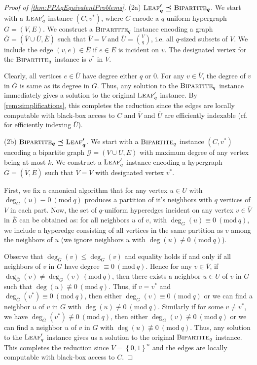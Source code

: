 \documentclass[10pt,a4paper]{article}
\theoremstyle{definition}
\theoremstyle{remark}
\newcommand{\contour}[2]{#2}
\newcommand{\inparen}[1]{\left ( #1 \right )}
\renewcommand{\mod}[1]{~\inparen{\mathrm{mod}~#1}}
\def\set#1{\left\{#1\right\}}
\newcommand{\parasc}[1]{\noindent \contour{black}{#1}}
\newcommand{\calG}{\mathcal{G}}
\newcommand{\bit}{\ensuremath{\set{0,1}}}
\newcommand{\qnum}{q}
\newcommand{\bipartiteq}{\ensuremath{\textsc{Bipartite}_\qnum}}
\newcommand{\leaf}{\ensuremath\textsc{Leaf}}
\newcommand{\bipartite}{\ensuremath{\textsc{Bipartite}}}
\newcommand{\reducible}{\preceq}
\begin{document}
\begin{proof}[Proof of \autoref{thm:PPAqEquivalentProblems}]
\medskip

\parasc{(2a) $\boldsymbol{\leaf'_q \reducible \bipartiteq}$.}
We start with a $\leaf'_q$ instance $(C, v^*)$, where $C$ encode a $q$-uniform hypergraph $G = (V, E)$. We construct a $\bipartite_q$ instance encoding a graph $\overline{G} = (\overline{V} \cup \overline{U}, \overline{E})$ such that $\overline{V} = V$ and $\overline{U} = \binom{V}{q}$, i.e. all $q$-sized subsets of $V$. We include the edge $(v,e) \in \overline{E}$ if $e \in E$ is incident on $v$. The designated vertex for the $\bipartite_q$ instance is $v^*$ in $\overline{V}$.

Clearly, all vertices $e \in \overline{U}$ have degree either $q$ or $0$. For any $v \in \overline{V}$, the degree of $v$ in $\overline{G}$ is same as its degree in $G$. Thus, any solution to the $\bipartite_q$ instance immediately gives a solution to the original $\leaf'_q$ instance. By \autoref{rem:simplifications}, this completes the reduction since the edges are locally computable with black-box access to $C$ and $\overline{V}$ and $\overline{U}$ are efficiently indexable (cf. \cite[\S2.3]{r31} for efficiently indexing $\overline{U}$).

\medskip

\parasc{(2b) $\boldsymbol{\bipartiteq \reducible \leaf'_q}$.} We start with a $\bipartite_q$ instance $(C, v^*)$ encoding a bipartite graph $\calG = (V \cup U,E)$ with maximum degree of any vertex being at most $k$. We construct a $\leaf'_q$ instance encoding a hypergraph $\overline{G} = (\overline{V}, \overline{E})$ such that $\overline{V} = V$ with designated vertex $v^*$.

First, we fix a canonical algorithm that for any vertex $u \in U$ with $\deg_{G}(u) \equiv 0 \mod{q}$ produces a partition of it's neighbors with $q$ vertices of $V$ in each part. Now, the set of $q$-uniform hyperedges incident on any vertex $v \in \overline{V}$ in $\overline{E}$ can be obtained as: for all neighbors $u$ of $v$, with $\deg_G(u) \equiv 0 \mod{q}$, we include a hyperedge consisting of all vertices in the same partition as $v$ among the neighbors of $u$ (we ignore neighbors $u$ with $\deg(u) \not\equiv 0 \mod{q}$).

Observe that $\deg_{\overline{G}}(v) \le \deg_{G}(v)$ and equality holds if and only if all neighbors of $v$ in $G$ have degree $\equiv 0 \mod{q}$. Hence for any $v \in \overline{V}$, if $\deg_{\overline{G}}(v) \ne \deg_G(v) \mod{q}$, then there exists a neighbor $u \in U$ of $v$ in $G$ such that $\deg(u) \not\equiv 0 \mod{q}$. Thus, if $v = v^*$ and $\deg_{\overline{G}}(v^*) \equiv 0 \mod{q}$, then either $\deg_G(v) \equiv 0 \mod{q}$ or we can find a neighbor $u$ of $v$ in $G$ with $\deg(u) \not\equiv 0 \mod{q}$. Similarly if for some $v \ne v^*$, we have $\deg_{\overline{G}}(v^*) \not\equiv 0 \mod{q}$, then either $\deg_G(v) \not\equiv 0 \mod{q}$ or we can find a neighbor $u$ of $v$ in $G$ with $\deg(u) \not\equiv 0 \mod{q}$. Thus, any solution to the $\leaf'_q$ instance gives us a solution to the original $\bipartite_q$ instance. This completes the reduction since $\overline{V} = \bit^n$ and the edges are locally computable with black-box access to $C$.


\end{proof}
\end{document}
